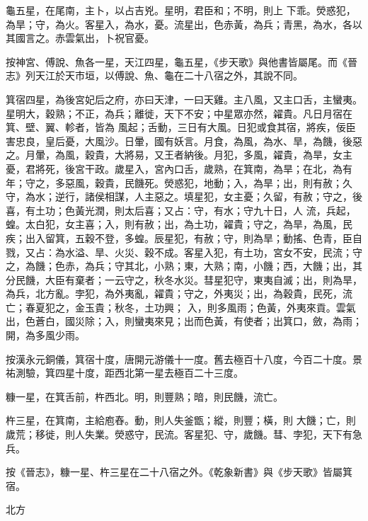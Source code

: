 \begin{pinyinscope}
 龜五星，在尾南，主卜，以占吉兇。星明，君臣和；不明，則上
 下乖。熒惑犯，為旱；守，為火。客星入，為水，憂。流星出，色赤黃，為兵；青黑，為水，各以其國言之。赤雲氣出，卜祝官憂。



 按神宮、傅說、魚各一星，天江四星，龜五星，《步天歌》與他書皆屬尾。而《晉志》列天江於天市垣，以傅說、魚、龜在二十八宿之外，其說不同。



 箕宿四星，為後宮妃后之府，亦曰天津，一曰天雞。主八風，又主口舌，主蠻夷。星明大，穀熟；不正，為兵；離徙，天下不安；中星眾亦然，糴貴。凡日月宿在箕、壁、翼、軫者，皆為
 風起；舌動，三日有大風。日犯或食其宿，將疾，佞臣害忠良，皇后憂，大風沙。日暈，國有妖言。月食，為風，為水、旱，為饑，後惡之。月暈，為風，穀貴，大將易，又王者納後。月犯，多風，糴貴，為旱，女主憂，君將死，後宮干政。歲星入，宮內口舌，歲熟，在箕南，為旱；在北，為有年；守之，多惡風，穀貴，民饑死。熒惑犯，地動；入，為旱；出，則有赦；久守，為水；逆行，諸侯相謀，人主惡之。填星犯，女主憂；久留，有赦；守之，後喜，有土功；色黃光潤，則太后喜；又占：守，有水；守九十日，人
 流，兵起，蝗。太白犯，女主喜；入，則有赦；出，為土功，糴貴；守之，為旱，為風，民疾；出入留箕，五穀不登，多蝗。辰星犯，有赦；守，則為旱；動搖、色青，臣自戮，又占：為水溢、旱、火災、穀不成。客星入犯，有土功，宮女不安，民流；守之，為饑；色赤，為兵；守其北，小熟；東，大熟；南，小饑；西，大饑；出，其分民饑，大臣有棄者；一云守之，秋冬水災。彗星犯守，東夷自滅；出，則為旱，為兵，北方亂。孛犯，為外夷亂，糴貴；守之，外夷災；出，為穀貴，民死，流亡；春夏犯之，金玉貴；秋冬，土功興；
 入，則多風雨；色黃，外夷來貢。雲氣出，色蒼白，國災除；入，則蠻夷來見；出而色黃，有使者；出箕口，斂，為雨；開，為多風少雨。



 按漢永元銅儀，箕宿十度，唐開元游儀十一度。舊去極百十八度，今百二十度。景祐測驗，箕四星十度，距西北第一星去極百二十三度。



 糠一星，在箕舌前，杵西北。明，則豐熟；暗，則民饑，流亡。



 杵三星，在箕南，主給庖舂。動，則人失釜甑；縱，則豐；橫，則
 大饑；亡，則歲荒；移徙，則人失業。熒惑守，民流。客星犯、守，歲饑。彗、孛犯，天下有急兵。



 按《晉志》，糠一星、杵三星在二十八宿之外。《乾象新書》與《步天歌》皆屬箕宿。



 北方




\end{pinyinscope}
